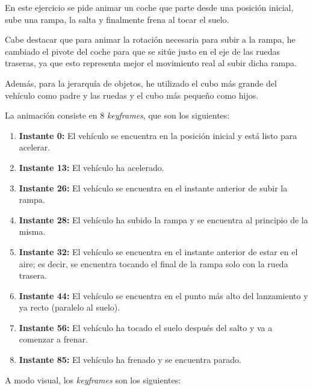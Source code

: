 \documentclass{article}
\begin{document}
{%

En este ejercicio se pide animar un coche que parte desde una posición inicial, sube una rampa, la salta y finalmente frena al tocar el suelo.


Cabe destacar que para animar la rotación necesaria para subir a la rampa, he cambiado el pivote del coche para que se sitúe justo en el eje de las ruedas traseras, ya que esto representa mejor el movimiento real al subir dicha rampa.

Además, para la jerarquía de objetos, he utilizado el cubo más grande del vehículo como padre y las ruedas y el cubo más pequeño como hijos.


La animación consiste en 8 \textit{keyframes}, que son los siguientes:

\begin{enumerate}
    \item \textbf{Instante 0:} El vehículo se encuentra en la posición inicial y está listo para acelerar.
    \item \textbf{Instante 13:} El vehículo ha acelerado.
    \item \textbf{Instante 26:} El vehículo se encuentra en el instante anterior de subir la rampa.
    \item \textbf{Instante 28:} El vehículo ha subido la rampa y se encuentra al principio de la misma.
    \item \textbf{Instante 32:} El vehículo se encuentra en el instante anterior de estar en el aire; es decir, se encuentra tocando el final de la rampa solo con la rueda trasera.
    \item \textbf{Instante 44:} El vehículo se encuentra en el punto más alto del lanzamiento y ya recto (paralelo al suelo).
    \item \textbf{Instante 56:} El vehículo ha tocado el suelo después del salto y va a comenzar a frenar.
    \item \textbf{Instante 85:} El vehículo ha frenado y se encuentra parado.
\end{enumerate}

A modo visual, los \textit{keyframes} son los siguientes:


}
\end{document}
